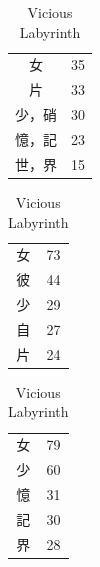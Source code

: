 \documentclass[uplatex,dvipdfmx,paper=a4paper,fontsize=11pt,jafontscale=0.9247,lang=ja]{jlreq}
\begin{document}
\begin{table}[htbp]
  \centering
  \begin{minipage}{0.32\linewidth}
    \centering  
    \caption{Eternal Core}
    \begin{tabular}{|c c|} \hline
    女 & 35 \\
    片 & 33 \\
    少，硝 & 30 \\
    憶，記 & 23 \\
    世，界 & 15\\ \hline
    \end{tabular}
  \end{minipage}
  \hfill
  \begin{minipage}{0.32\linewidth}
    \centering
    \caption{Luminous Sky}
    \begin{tabular}{|c c|} \hline
    女 & 73 \\
    彼 & 44 \\
    少 & 29 \\
    自 & 27 \\
    片 & 24 \\ \hline
    \end{tabular}
  \end{minipage}
  \hfill
  \begin{minipage}{0.32\linewidth}
      \centering
      \caption{Vicious Labyrinth}
      \begin{tabular}{|c c|} \hline
      女 & 79 \\
      少 & 60 \\
      憶 & 31 \\
      記 & 30 \\
      界 & 28 \\ \hline
      \end{tabular}
  \end{minipage}
\end{table}
\end{document}
